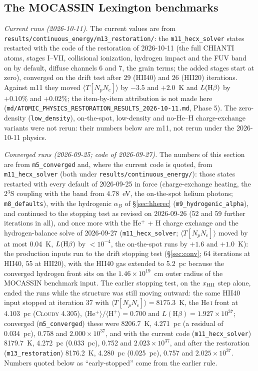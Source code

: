 \documentclass[english,a4paper]{my_memo}
\newcommand{\code}[1]{\texttt{#1}}
\begin{document}
\subsection{The MOCASSIN Lexington benchmarks}
\label{sec:hii}
\emph{Current runs (2026-10-11).}  The current values are from
\code{results/\allowbreak continuous\_energy/\allowbreak m13\_restoration/}:
the \code{m11\_hecx\_solver} states restarted with the code of the
restoration of 2026-10-11 (the full CHIANTI atoms, stages I--VII,
collisional ionization, hydrogen impact and the FUV band on by default,
diffuse channels 6 and 7, the grain terms; the added stages start at zero),
converged on the drift test after 29 (HII40) and 26 (HII20) iterations.
Against m11 they moved $\langle T[N_pN_e]\rangle$ by $-3.5$ and $+2.0$~K
and $L({\rm H}\beta)$ by $+0.10\%$ and $+0.02\%$; the item-by-item
attribution is not made here
(\code{md/ATOMIC\_PHYSICS\_RESTORATION\_RESULTS\_2026-10-11.md}, Phase 5).
The zero-density (\code{low\_density}), on-the-spot, low-density and
no-He--H charge-exchange variants were not rerun: their numbers below are
m11, not rerun under the 2026-10-11 physics.

\emph{Converged runs (2026-09-25; code of 2026-09-27).}  The
numbers of this section are from \code{m5\_converged} and, where the
current code is quoted, from \code{m11\_hecx\_solver} (both under
\code{results/\allowbreak continuous\_energy/}): those states restarted
with every default of 2026-09-25 in force (charge-exchange heating, the
2$^3$S coupling with the band from 4.78~eV, the on-the-spot helium photons;
\code{m8\_defaults}), with the hydrogenic $\alpha_B$ of \S\ref{sec:hherec}
(\code{m9\_hydrogenic\_alpha}), and continued to the stopping test as
revised on 2026-09-26 (52 and 59 further iterations in all), and once more
with the He$^+$ + H charge exchange and the hydrogen-balance solve of
2026-09-27 (\code{m11\_hecx\_solver}; $\langle T[N_pN_e]\rangle$ moved
by at most 0.04~K, $L({\rm H}\beta)$ by $<10^{-4}$, the on-the-spot runs
by $+1.6$ and $+1.0$~K): the production inputs run to
the drift stopping test (\S\ref{sec:conv}; 64 iterations at HII40, 55 at
HII20), with the HII40 gas extended to 5.2~pc because the converged
hydrogen front sits on the $1.46\times10^{19}$~cm outer radius of the
MOCASSIN benchmark input.  The earlier stopping test, on the $x_{\rm HII}$
step alone, ended the runs while the structure was still moving outward:
the same HII40 input stopped at iteration 37 with
$\langle T[N_pN_e]\rangle = 8175.3$~K, the He\,\textsc{i} front at 4.103~pc
(\textsc{Cloudy} 4.305), $\langle\mathrm{He^+}\rangle/\langle\mathrm{H^+}\rangle
= 0.700$ and $L(\mathrm{H}\beta) = 1.927{\times}10^{37}$; converged
(\code{m5\_converged}) these were 8206.7~K, 4.271~pc (a residual of
0.034~pc), 0.758 and $2.000{\times}10^{37}$, and with the current code
(\code{m11\_hecx\_solver}) 8179.7~K, 4.272~pc (0.033~pc), 0.752 and
$2.023{\times}10^{37}$, and after the restoration (\code{m13\_restoration})
8176.2~K, 4.280~pc (0.025~pc), 0.757 and $2.025{\times}10^{37}$.  Numbers quoted below as ``early-stopped'' come from
the earlier rule.
\end{document}

